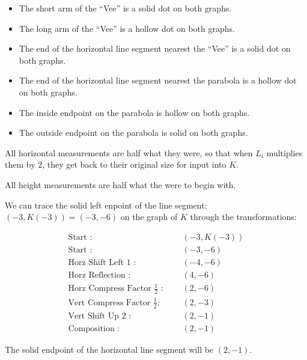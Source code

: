 \documentclass{ximera}
\begin{document}
\begin{itemize}
\item The short arm of the ``Vee'' is a solid dot on both graphs.
\item The long arm of the ``Vee'' is a hollow dot on both graphs.
\item The end of the horizontal line segment nearest the ``Vee'' is a solid dot on both graphs.
\item The end of the horizontal line segment nearest the parabola is a hollow dot on both graphs.
\item The inside endpoint on the parabola is hollow on both graphs.
\item The outside endpoint on the parabola is solid on both graphs.
\end{itemize}










All horizontal measurements are half what they were, so that when $L_i$ multiplies them by $2$, they get back to their original size for input into $K$.

All height measurements are half what the were to begin with.



We can trace the solid left enpoint of the line segment: $(-3, K(-3)) = (-3, -6)$ on the graph of $K$ through the transformations:





\begin{align*}
\text{Start :} & \text{  } & (-3, K(-3))  \\
\text{Start :} & \text{  } & (-3, -6) \\
\text{Horz Shift Left $1$ :} & \text{  } & (-4,-6)   \\
\text{Horz Reflection :} & \text{  } & (4, -6)   \\
\text{Horz Compress Factor $\tfrac{1}{2}$ :}  & \text{  } & (2, -6)   \\
\text{Vert Compress Factor $\tfrac{1}{2}$:} & \text{  } & (2, -3)   \\
\text{Vert Shift Up $2$ :} & \text{  } & (2, -1)   \\
\text{Composition :} & \text{  } & (2, -1)   
\end{align*}


The solid endpoint of the horizontal line segment will be $(2, -1)$.
\end{document}

